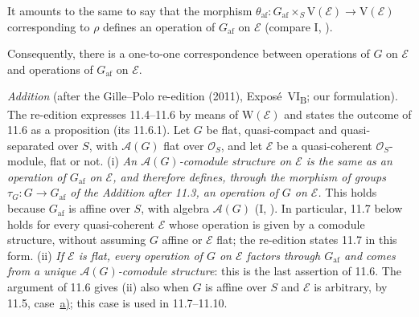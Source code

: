 It amounts to the same to say that the morphism
\(\theta_{\mathrm{af}}:G_{\mathrm{af}}\times_S\mathrm V(\mathcal E)\to\mathrm V(\mathcal E)\)
corresponding to \(\rho\) defines an operation of \(G_{\mathrm{af}}\)
on \(\mathcal E\) \textup{(compare I, )}.

Consequently, there is a one-to-one correspondence between
operations of \(G\) on \(\mathcal E\) and operations of
\(G_{\mathrm{af}}\) on \(\mathcal E\).

\medskip
{}\label{prop:sga3-VIB-11.6.1}%
\noindent
\emph{Addition} (after the Gille--Polo re-edition (2011), Expos\'e~VI\textsubscript{B}; our formulation).
The re-edition expresses 11.4--11.6 by means of \(\mathrm W(\mathcal E)\) and states the outcome of 11.6 as a
proposition (its 11.6.1). Let \(G\) be flat, quasi-compact and quasi-separated over \(S\), with \(\mathcal A(G)\)
flat over \(\mathcal O_S\), and let \(\mathcal E\) be a quasi-coherent \(\mathcal O_S\)-module, flat or not.
(i) \emph{An \(\mathcal A(G)\)-comodule structure on \(\mathcal E\) is the same as an operation of
\(G_{\mathrm{af}}\) on \(\mathcal E\), and therefore defines, through the morphism of groups
\(\tau_G\colon G\to G_{\mathrm{af}}\) of the Addition after 11.3, an operation of \(G\) on \(\mathcal E\).} This
holds because \(G_{\mathrm{af}}\) is affine over \(S\), with algebra \(\mathcal A(G)\) (I,
). In particular, 11.7 below holds for every quasi-coherent
\(\mathcal E\) whose operation is given by a comodule structure, without assuming \(G\) affine or \(\mathcal E\)
flat; the re-edition states 11.7 in this form.
\label{concl:sga3-VIB-11.6.1-ii}%
(ii) \emph{If \(\mathcal E\) is flat, every operation of \(G\) on \(\mathcal E\) factors through
\(G_{\mathrm{af}}\) and comes from a unique \(\mathcal A(G)\)-comodule structure}: this is the last assertion of
11.6. The argument of 11.6 gives (ii) also when \(G\) is affine over \(S\) and \(\mathcal E\) is arbitrary, by
11.5, case~\hyperref[concl:sga3-VIB-11.5-a]{\textup{a)}}; this case is used in 11.7--11.10.


